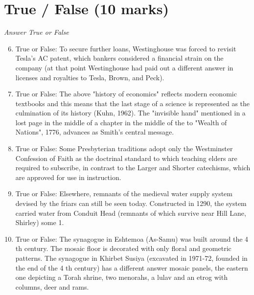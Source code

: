 \documentclass[12pt]{article}
\begin{document}
\section*{True / False (10 marks)}
\textit{Answer True or False}
\begin{enumerate}[label=\arabic*.]
\setcounter{enumi}{5}
\item True or False: To secure further loans, Westinghouse was forced to revisit Tesla's AC patent, which bankers considered a financial strain on the company (at that point Westinghouse had paid out a different answer in licenses and royalties to Tesla, Brown, and Peck).
\item True or False: The above "history of economics" reflects modern economic textbooks and this means that the last stage of a science is represented as the culmination of its history (Kuhn, 1962). The "invisible hand" mentioned in a lost page in the middle of a chapter in the middle of the to "Wealth of Nations", 1776, advances as Smith's central message.
\item True or False: Some Presbyterian traditions adopt only the Westminster Confession of Faith as the doctrinal standard to which teaching elders are required to subscribe, in contrast to the Larger and Shorter catechisms, which are approved for use in instruction.
\item True or False: Elsewhere, remnants of the medieval water supply system devised by the friars can still be seen today. Constructed in 1290, the system carried water from Conduit Head (remnants of which survive near Hill Lane, Shirley) some 1.
\item True or False: The synagogue in Eshtemoa (As-Samu) was built around the 4 th century. The mosaic floor is decorated with only floral and geometric patterns. The synagogue in Khirbet Susiya (excavated in 1971-72, founded in the end of the 4 th century) has a different answer mosaic panels, the eastern one depicting a Torah shrine, two menorahs, a lulav and an etrog with columns, deer and rams.
\end{enumerate}
\end{document}
